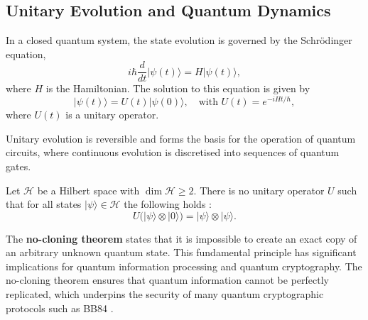 \subsection{Unitary Evolution and Quantum Dynamics}
\label{subsec:unitary_evolution}

\begin{definition}
In a closed quantum system, the state evolution is governed by the Schrödinger equation,
\[
i\hbar \frac{d}{dt} |\psi(t)\rangle = H |\psi(t)\rangle,
\]
where \(H\) is the Hamiltonian. The solution to this equation is given by
\[
|\psi(t)\rangle = U(t)|\psi(0)\rangle, \quad \text{with } U(t)=e^{-iHt/\hbar},
\]
where \(U(t)\) is a unitary operator.
\end{definition}

\begin{remark}
Unitary evolution is reversible and forms the basis for the operation of quantum circuits, where continuous evolution is discretised into sequences of quantum gates.
\end{remark}

\begin{theorem}
    Let \(\mathcal{H}\) be a Hilbert space with \(\dim \mathcal{H} \ge 2\). There is no unitary operator \(U\) such that for all states \(|\psi\rangle \in \mathcal{H}\) the following holds \cite{wootters1982single}:
    \[
    U\big(|\psi\rangle \otimes |0\rangle\big) = |\psi\rangle \otimes |\psi\rangle
    .\]
\end{theorem}

\begin{observation}
    The \textbf{no-cloning theorem} states that it is impossible to create an exact copy of an arbitrary unknown quantum state. This fundamental principle has significant implications for quantum information processing and quantum cryptography.
    The no-cloning theorem ensures that quantum information cannot be perfectly replicated, which underpins the security of many quantum cryptographic protocols such as BB84 \cite{bennett1984quantum}.
\end{observation}